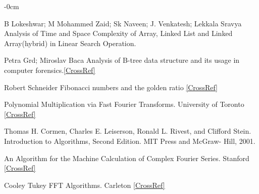\documentclass[journal,article,submit,moreauthors,algorithms]{Definitions/mdpi}
\begin{document}
\begin{adjustwidth}{-\extralength}{0cm}
\begin{thebibliography}{999}
B Lokeshwar; M Mohammed Zaid; Sk Naveen; J. Venkatesh; Lekkala Sravya Analysis of Time and Space Complexity of Array, Linked List and Linked Array(hybrid) in Linear Search Operation.

Petra Grd; Miroslav Baca Analysis of B-tree data structure and its usage in computer forensics.\href{https://www.researchgate.net/publication/210381551_Analysis_of_B-tree_data_structure_and_its_usage_in_computer_forensics}{[CrossRef]}

 Robert Schneider Fibonacci numbers and the golden ratio \href{https://www.researchgate.net/publication/310671676_Fibonacci_numbers_and_the_golden_ratio}{[CrossRef]}

 Polynomial Multiplication via Fast Fourier Transforms. University of Toronto \href{http://www.cs.toronto.edu/~denisp/csc373/docs/tutorial3-adv-writeup.pdf}{[CrossRef]}

Thomas H. Cormen, Charles E. Leiserson, Ronald
L. Rivest, and Clifford Stein. Introduction to Algorithms, Second Edition. MIT Press and McGraw-
Hill, 2001.

An Algorithm for the Machine Calculation of Complex Fourier Series. Stanford \href{https://web.stanford.edu/class/cme324/classics/cooley-tukey.pdf}{[CrossRef]} 

Cooley Tukey FFT Algorithms. Carleton \href{http://people.scs.carleton.ca/~maheshwa/courses/5703COMP/16Fall/FFT_Report.pdf}{[CrossRef]}
\end{thebibliography}
\PublishersNote{}
\end{adjustwidth}
\end{document}
